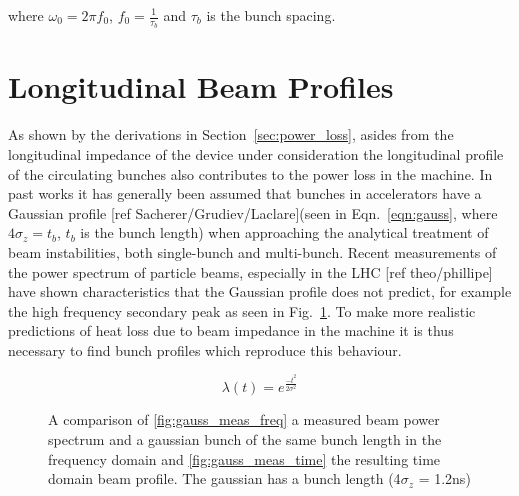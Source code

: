where $\omega_{0} = 2\pi f_{0}$, $f_{0} = \frac{1}{\tau_{b}}$ and $\tau_{b}$ is the bunch spacing.

\section{Longitudinal Beam Profiles}

As shown by the derivations in Section~\ref{sec:power_loss}, asides from the longitudinal impedance of the device under consideration the longitudinal profile of the circulating bunches also contributes to the power loss in the machine. In past works it has generally been assumed that bunches in accelerators have a Gaussian profile [ref Sacherer/Grudiev/Laclare](seen in Eqn.~\ref{eqn:gauss}, where $4\sigma_{z} = t_{b}$, $t_{b}$ is the bunch length) when approaching the analytical treatment of beam instabilities, both single-bunch and multi-bunch. Recent measurements of the power spectrum of particle beams, especially in the LHC [ref theo/phillipe] have shown characteristics that the Gaussian profile does not predict, for example the high frequency secondary peak as seen in Fig.~\ref{fig:measured_gauss}. To make more realistic predictions of heat loss due to beam impedance in the machine it is thus necessary to find bunch profiles which reproduce this behaviour.

\begin{equation}
\lambda \left( t \right) = e^{\frac{-t^{2}}{2\sigma^{2}}}
\label{eqn:gauss}
\end{equation}

\begin{figure}
\caption{A comparison of \ref{fig:gauss_meas_freq} a measured beam power spectrum and a gaussian bunch of the same bunch length in the frequency domain and \ref{fig:gauss_meas_time} the resulting time domain beam profile. The gaussian has a bunch length (4$\sigma_{z}$ = 1.2ns) }
\label{fig:measured_gauss}
\end{figure}

